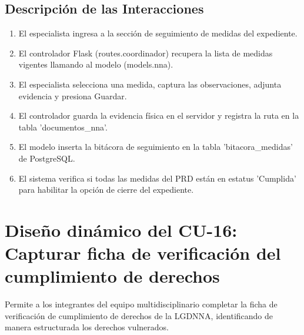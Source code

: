 \subsection{Descripción de las Interacciones}
\begin{enumerate}
    \item El especialista ingresa a la sección de seguimiento de medidas del expediente.
    \item El controlador Flask (routes.coordinador) recupera la lista de medidas vigentes llamando al modelo (models.nna).
    \item El especialista selecciona una medida, captura las observaciones, adjunta evidencia y presiona Guardar.
    \item El controlador guarda la evidencia física en el servidor y registra la ruta en la tabla 'documentos\_nna'.
    \item El modelo inserta la bitácora de seguimiento en la tabla 'bitacora\_medidas' de PostgreSQL.
    \item El sistema verifica si todas las medidas del PRD están en estatus 'Cumplida' para habilitar la opción de cierre del expediente.
\end{enumerate}

\cleardoublepage
\section{Diseño dinámico del CU-16: Capturar ficha de verificación del cumplimiento de derechos}
\label{sec:disenoDinamicoCU16}

Permite a los integrantes del equipo multidisciplinario completar la ficha de verificación de cumplimiento de derechos de la LGDNNA, identificando de manera estructurada los derechos vulnerados.

